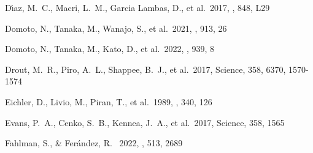 \documentclass[twocolumn,twocolappendix]{aastex63}
\begin{document}
{\begin{thebibliography}{}


 D{\'\i}az, M.~C., Macri, L.~M., Garcia Lambas, D., et al.\ 2017, \apjl, 848, L29




 Domoto, N., Tanaka, M., Wanajo, S., et al.\ 2021, \apj, 913, 26


 Domoto, N., Tanaka, M., Kato, D., et al.\ 2022, \apj, 939, 8



 Drout, M.~R., Piro, A.~L., Shappee, B.~J., et al.\ 2017, Science, 358, 6370, 1570-1574




 Eichler, D., Livio, M., Piran, T., et al.\ 1989, \nat, 340, 126








 Evans, P.~A., Cenko, S.~B., Kennea, J.~A., et al.\ 2017, Science, 358, 1565



 Fahlman, S., \& Fer\'andez, R. \ 2022, \mnras, 513, 2689







\end{thebibliography}}
\end{document}
